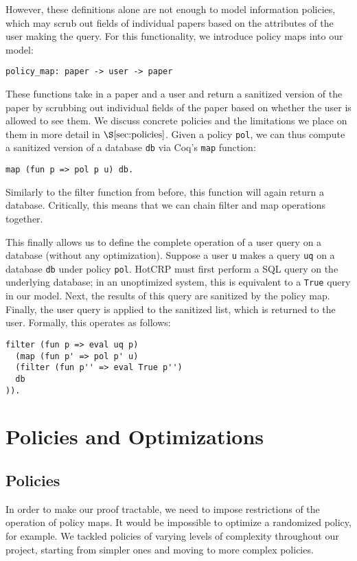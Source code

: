 \documentclass[11pt,journal]{IEEEtran}
\begin{document}
However, these definitions alone are not enough to model information policies, which may scrub out fields of individual papers based on the attributes of the user making the query.  For this functionality, we introduce policy maps into our model:
\begin{verbatim}
policy_map: paper -> user -> paper 
\end{verbatim}
These functions take in a paper and a user and return a sanitized version of the paper by scrubbing out individual fields of the paper based on whether the user is allowed to see them.  We discuss concrete policies and the limitations we place on them in more detail in $\S\ref{sec:policies}$. Given a policy \texttt{pol}, we can thus compute a sanitized version of a database \texttt{db} via Coq's \texttt{map} function:
\begin{verbatim}
map (fun p => pol p u) db.
\end{verbatim}
Similarly to the filter function from before, this function will again return a database.  Critically, this means that we can chain filter and map operations together.

This finally allows us to define the complete operation of a user query on a database (without any optimization).  Suppose a user \texttt{u} makes a query \texttt{uq} on a database \texttt{db} under policy \texttt{pol}.  HotCRP must first perform a SQL query on the underlying database; in an unoptimized system, this is equivalent to a \texttt{True} query in our model.  Next, the results of this query are sanitized by the policy map.  Finally, the user query is applied to the sanitized list, which is returned to the user.  Formally, this operates as follows:
\begin{verbatim}
filter (fun p => eval uq p) 
  (map (fun p' => pol p' u) 
  (filter (fun p'' => eval True p'')
  db
)).
\end{verbatim}

\section{Policies and Optimizations}
\label{sec:policies_optimizations}

\subsection{Policies}
\label{sec:policies}
In order to make our proof tractable, we need to impose restrictions of the operation of policy maps.  It would be impossible to optimize a randomized policy, for example.  We tackled policies of varying levels of complexity throughout our project, starting from simpler ones and moving to more complex policies.
\end{document}
